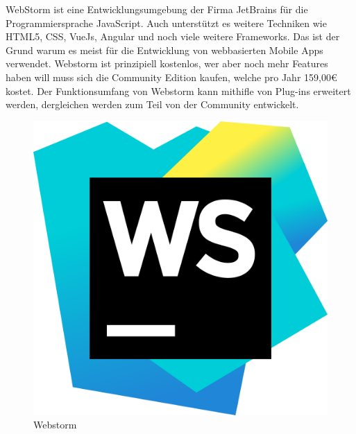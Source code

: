 WebStorm ist eine Entwicklungsumgebung der Firma JetBrains für die Programmiersprache JavaScript. Auch unterstützt es weitere Techniken wie HTML5, CSS, VueJs, Angular und noch viele weitere Frameworks. Das ist der Grund warum es meist für die Entwicklung von webbasierten Mobile Apps verwendet.
Webstorm ist prinzipiell kostenlos, wer aber noch mehr Features haben will muss sich die Community Edition kaufen, welche pro Jahr 159,00€ kostet.
Der Funktionsumfang von Webstorm kann mithifle von Plug-ins erweitert werden, dergleichen werden zum Teil von der Community entwickelt.

\begin{figure}[h!]
    \centering
    \includegraphics[width=0.3\linewidth]{pics/WebStorm_Icon.png}
    \caption{Webstorm}
    \label{fig:enter-label}
\end{figure}

\cite{Webstorm}



